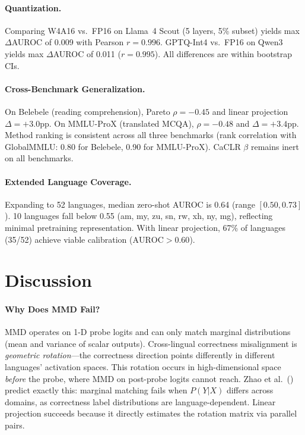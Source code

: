 \documentclass[11pt,a4paper]{article}
\begin{document}
\paragraph{Quantization.}
Comparing W4A16 vs.\ FP16 on Llama~4 Scout (5 layers, 5\% subset) yields max $\Delta$AUROC of 0.009 with Pearson $r = 0.996$.
GPTQ-Int4 vs.\ FP16 on Qwen3 yields max $\Delta$AUROC of 0.011 ($r = 0.995$).
All differences are within bootstrap CIs.

\paragraph{Cross-Benchmark Generalization.}
On Belebele (reading comprehension), Pareto $\rho = -0.45$ and linear projection $\Delta = +3.0$pp.
On MMLU-ProX (translated MCQA), $\rho = -0.48$ and $\Delta = +3.4$pp.
Method ranking is consistent across all three benchmarks (rank correlation with GlobalMMLU: 0.80 for Belebele, 0.90 for MMLU-ProX).
CaCLR $\beta$ remains inert on all benchmarks.

\paragraph{Extended Language Coverage.}
Expanding to 52 languages, median zero-shot AUROC is 0.64 (range $[0.50, 0.73]$).
10 languages fall below 0.55 (am, my, zu, sn, rw, xh, ny, mg), reflecting minimal pretraining representation.
With linear projection, 67\% of languages (35/52) achieve viable calibration ($\text{AUROC} > 0.60$).

\section{Discussion}

\paragraph{Why Does MMD Fail?}
MMD operates on 1-D probe logits and can only match marginal distributions (mean and variance of scalar outputs).
Cross-lingual correctness misalignment is \emph{geometric rotation}---the correctness direction points differently in different languages' activation spaces.
This rotation occurs in high-dimensional space \emph{before} the probe, where MMD on post-probe logits cannot reach.
Zhao et al.\ (\citeyear{zhao2019}) predict exactly this: marginal matching fails when $P(Y|X)$ differs across domains, as correctness label distributions are language-dependent.
Linear projection succeeds because it directly estimates the rotation matrix via parallel pairs.
\end{document}
